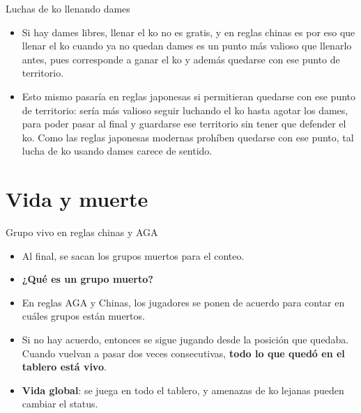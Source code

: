\documentclass{beamer}
\begin{document}
\begin{frame}{Luchas de ko llenando dames}
  \begin{itemize}
   \item Si hay dames libres, llenar el ko no es gratis, y en reglas chinas es por eso que llenar el ko cuando ya no quedan dames es un punto más valioso que llenarlo
          antes, pues corresponde a ganar el ko y además quedarse con ese punto de territorio.
        \item Esto mismo pasaría en reglas japonesas si permitieran quedarse con ese punto de territorio: sería más valioso seguir luchando el ko hasta agotar los dames,
        para poder pasar al final y guardarse ese territorio sin tener que defender el ko. Como las reglas japonesas modernas prohíben quedarse con ese punto, tal lucha de ko
        usando dames carece de sentido.
  \end{itemize}
\end{frame}

\section{Vida y muerte}

\begin{frame}{Grupo vivo en reglas chinas y AGA}
    \begin{itemize}
        \item Al final, se sacan los grupos muertos para el conteo.
        \item \textbf{¿Qué es un grupo muerto?}
        \item En reglas AGA y Chinas, los jugadores se ponen de acuerdo para contar en cuáles grupos están muertos.
        \item Si no hay acuerdo, entonces se sigue jugando desde la posición que quedaba. Cuando vuelvan a pasar dos veces consecutivas, \textbf{todo lo que quedó en el tablero está vivo}.
        \item \textbf{Vida global}: se juega en todo el tablero, y amenazas de ko lejanas pueden cambiar el status.
    \end{itemize}
    
\end{frame}
\end{document}
